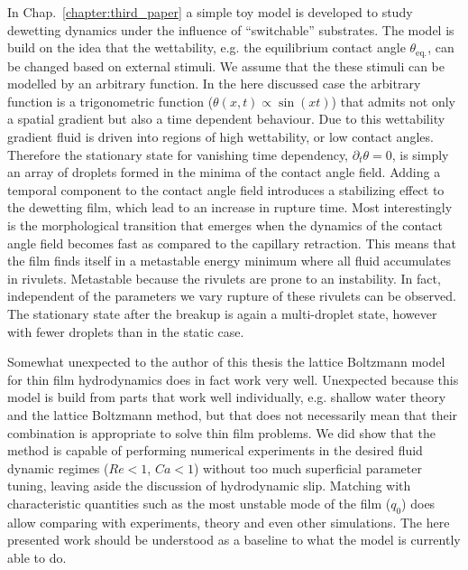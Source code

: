 In Chap.~\ref{chapter:third_paper} a simple toy model is developed to study dewetting dynamics under the influence of ``switchable'' substrates.
The model is build on the idea that the wettability, e.g. the equilibrium contact angle $\theta_{\text{eq.}}$, can be changed based on external stimuli. 
We assume that the these stimuli can be modelled by an arbitrary function.
In the here discussed case the arbitrary function is a trigonometric function ($\theta(x,t) \propto \sin(x t)$) that admits not only a spatial gradient but also a time dependent behaviour.
Due to this wettability gradient fluid is driven into regions of high wettability, or low contact angles.
Therefore the stationary state for vanishing time dependency, $\partial_t\theta = 0$, is simply an array of droplets formed in the minima of the contact angle field.
Adding a temporal component to the contact angle field introduces a stabilizing effect to the dewetting film, which lead to an increase in rupture time.
Most interestingly is the morphological transition that emerges when the dynamics of the contact angle field becomes fast as compared to the capillary retraction.
This means that the film finds itself in a metastable energy minimum where all fluid accumulates in rivulets.
Metastable because the rivulets are prone to an instability. 
In fact, independent of the parameters we vary rupture of these rivulets can be observed. 
The stationary state after the breakup is again a multi-droplet state, however with fewer droplets than in the static case.

Somewhat unexpected to the author of this thesis the lattice Boltzmann model for thin film hydrodynamics does in fact work very well. 
Unexpected because this model is build from parts that work well individually, e.g. shallow water theory and the lattice Boltzmann method, but that does not necessarily mean that their combination is appropriate to solve thin film problems.  
We did show that the method is capable of performing numerical experiments in the desired fluid dynamic regimes ($Re < 1$, $Ca < 1$) without too much superficial parameter tuning, leaving aside the discussion of hydrodynamic slip. 
Matching with characteristic quantities such as the most unstable mode of the film ($q_0$) does allow comparing with experiments, theory and even other simulations.
The here presented work should be understood as a baseline to what the model is currently able to do.

